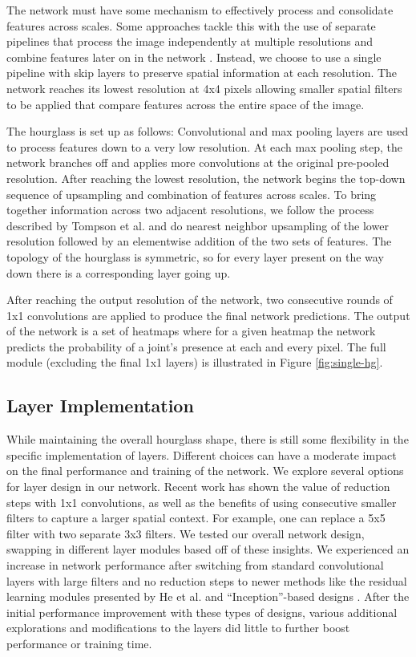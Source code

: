 \documentclass[runningheads]{llncs}
\begin{document}
The network must have some mechanism to effectively process and
consolidate features across scales. Some approaches tackle this with
the use of separate pipelines that process the image independently at
multiple resolutions and combine features later on in the network
\cite{tompson2014joint, wei2016machines}. Instead, we choose to use a
single pipeline with skip layers to preserve spatial information at
each resolution. The network reaches its lowest resolution at 4x4
pixels allowing smaller spatial filters to be applied that compare
features across the entire space of the image.

The hourglass is set up as follows: Convolutional and max pooling
layers are used to process features down to a very low resolution. At
each max pooling step, the network branches off and applies more
convolutions at the original pre-pooled resolution. After reaching the
lowest resolution, the network begins the top-down sequence of
upsampling and combination of features across scales. To bring
together information across two adjacent resolutions, we follow the
process described by Tompson et al. \cite{tompson2014joint} and do
nearest neighbor upsampling of the lower resolution followed by an
elementwise addition of the two sets of features. The topology of the
hourglass is symmetric, so for every layer present on the way down
there is a corresponding layer going up.

After reaching the output resolution of the network, two consecutive
rounds of 1x1 convolutions are applied to produce the final network
predictions. The output of the network is a set of heatmaps where for
a given heatmap the network predicts the probability of a joint's
presence at each and every pixel. The full module (excluding the final
1x1 layers) is illustrated in Figure \ref{fig:single-hg}.

\subsection{Layer Implementation}

While maintaining the overall hourglass shape, there is still some
flexibility in the specific implementation of layers. Different
choices can have a moderate impact on the final performance and
training of the network. We explore several options for layer design
in our network. Recent work has shown the value of reduction steps
with 1x1 convolutions, as well as the benefits of using consecutive
smaller filters to capture a larger spatial context.\cite{he2015deep,
  szegedy2015going} For example, one can replace a 5x5 filter with two
separate 3x3 filters. We tested our overall network design, swapping
in different layer modules based off of these insights. We experienced
an increase in network performance after switching from standard
convolutional layers with large filters and no reduction steps to
newer methods like the residual learning modules presented by He et
al. \cite{he2015deep} and ``Inception''-based designs
\cite{szegedy2015going}. After the initial performance improvement
with these types of designs, various additional explorations and
modifications to the layers did little to further boost performance or
training time.
\end{document}
